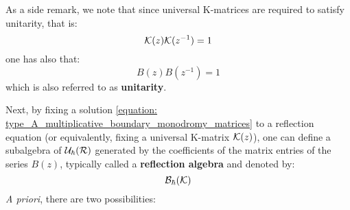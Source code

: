         \begin{remark}
            As a side remark, we note that since universal K-matrices are required to satisfy unitarity, that is:
                $$\mathcal{K}(z) \mathcal{K}(z^{-1}) = 1$$
            one has also that:
                \begin{equation} \label{equation: type_A_multiplicative_boundary_monodromy_matrices_unitarity}
                    B(z) B(z^{-1}) = 1
                \end{equation}
            which is also referred to as \textbf{unitarity}.
        \end{remark}
        
        Next, by fixing a solution \eqref{equation: type_A_multiplicative_boundary_monodromy_matrices} to a reflection equation (or equivalently, fixing a universal K-matrix $\mathcal{K}(z)$), one can define a subalgebra of $\mathcal{U}_{\hbar}(\mathcal{R})$ generated by the coefficients of the matrix entries of the series $B(z)$, typically called a \textbf{reflection algebra} and denoted by:
            $$\mathcal{B}_{\hbar}(\mathcal{K})$$
        \textit{A priori}, there are two possibilities:
